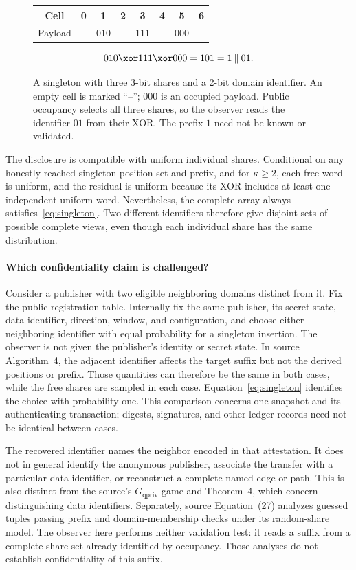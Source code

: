 \begin{figure}[ht]
\centering
\begin{tabular}{c*{7}{c}}
\toprule
Cell & 0 & 1 & 2 & 3 & 4 & 5 & 6\\
\midrule
Payload & -- & $010$ & -- & $111$ & -- & $000$ & --\\
\bottomrule
\end{tabular}
\[
  010\xor111\xor000=101=1\mathbin\Vert01.
\]
\caption{A singleton with three 3-bit shares and a 2-bit domain identifier.
An empty cell is marked ``--''; $000$ is an occupied payload. Public occupancy
selects all three shares, so the observer reads the identifier $01$ from their
XOR. The prefix $1$ need not be known or validated.}
\label{fig:example}
\end{figure}

The disclosure is compatible with uniform individual shares. Conditional on
any honestly reached singleton position set and prefix, and for $\kappa\geq2$,
each free word is uniform, and the residual is uniform because its XOR includes
at least one independent uniform word. Nevertheless, the complete array
always satisfies~\eqref{eq:singleton}. Two different identifiers therefore
give disjoint sets of possible complete views, even though each individual
share has the same distribution.

\paragraph{Which confidentiality claim is challenged?}
Consider a publisher with two eligible neighboring domains distinct from it.
Fix the public registration table. Internally fix the same publisher, its
secret state, data identifier, direction, window, and configuration, and choose
either neighboring identifier with equal probability for a singleton insertion.
The observer is not given the publisher's identity or secret state. In source
Algorithm~4, the adjacent identifier affects the target suffix but not the
derived positions or prefix. Those quantities can therefore be the same in
both cases, while the free shares are sampled in each case.
Equation~\eqref{eq:singleton} identifies the choice with probability one.
This comparison concerns one snapshot and its authenticating transaction;
digests, signatures, and other ledger records need not be identical between cases.

The recovered identifier names the neighbor encoded in that attestation.
It does not in general identify the anonymous publisher, associate the transfer with a
particular data identifier, or reconstruct a complete named edge or path.
This is also distinct from the source's $G_{\mathrm{qpriv}}$ game and
Theorem~4, which concern distinguishing data identifiers. Separately, source
Equation~(27) analyzes guessed tuples passing prefix and domain-membership
checks under its random-share model. The observer here performs neither
validation test: it reads a suffix from a complete share set already identified
by occupancy. Those analyses do not establish confidentiality of this suffix.

